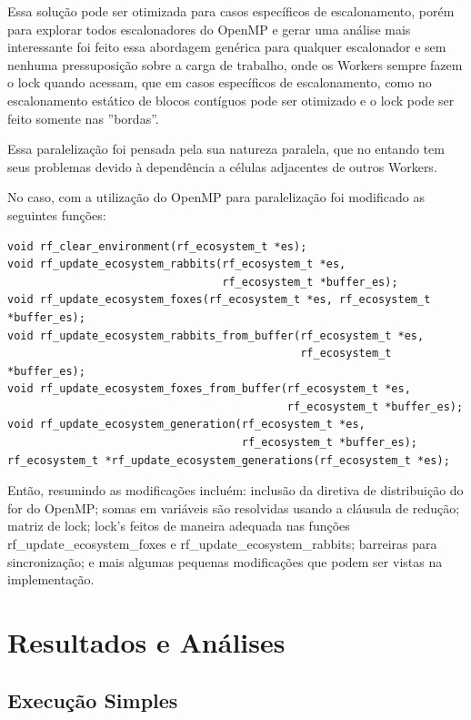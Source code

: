 \documentclass[12pt]{article}
\begin{document}
Essa solução pode ser otimizada para casos específicos de escalonamento, porém para explorar todos escalonadores do OpenMP e gerar uma análise mais interessante foi feito essa abordagem genérica para qualquer escalonador e sem nenhuma pressuposição sobre a carga de trabalho, onde os Workers sempre fazem o lock quando acessam, que em casos específicos de escalonamento, como no escalonamento estático de blocos contíguos pode ser otimizado e o lock pode ser feito somente nas ''bordas''.

Essa paralelização foi pensada pela sua natureza paralela, que no entando tem seus problemas devido à dependência a células adjacentes de outros Workers.

No caso, com a utilização do OpenMP para paralelização foi modificado as seguintes funções:

\begin{verbatim}
void rf_clear_environment(rf_ecosystem_t *es);
void rf_update_ecosystem_rabbits(rf_ecosystem_t *es,
                                 rf_ecosystem_t *buffer_es);
void rf_update_ecosystem_foxes(rf_ecosystem_t *es, rf_ecosystem_t *buffer_es);
void rf_update_ecosystem_rabbits_from_buffer(rf_ecosystem_t *es,
                                             rf_ecosystem_t *buffer_es);
void rf_update_ecosystem_foxes_from_buffer(rf_ecosystem_t *es,
                                           rf_ecosystem_t *buffer_es);
void rf_update_ecosystem_generation(rf_ecosystem_t *es,
                                    rf_ecosystem_t *buffer_es);
rf_ecosystem_t *rf_update_ecosystem_generations(rf_ecosystem_t *es);
      \end{verbatim}


Então, resumindo as modificações incluém: inclusão da diretiva de distribuição do for do OpenMP; somas em variáveis são resolvidas usando a cláusula de redução; matriz de lock; lock's feitos de maneira adequada nas funções
rf\_update\_ecosystem\_foxes e
rf\_update\_ecosystem\_rabbits; barreiras para sincronização; e mais algumas pequenas modificações que podem ser vistas na implementação.





\section{Resultados e Análises}
\subsection{Execução Simples}
\end{document}
